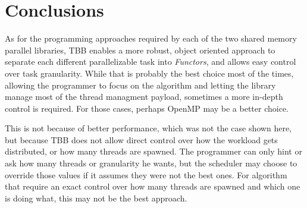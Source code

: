 \section{Conclusions}
\label{sec:900}

As for the programming approaches required by each of the two shared memory parallel libraries, TBB enables a more robust, object oriented approach to separate each different parallelizable task into \textit{Functors}, and allows easy control over task granularity. While that is probably the best choice most of the times, allowing the programmer to focus on the algorithm and letting the library manage most of the thread managment payload, sometimes a more in-depth control is required. For those cases, perhaps OpenMP may be a better choice.

This is not because of better performance, which was not the case shown here, but because TBB does not allow direct control over how the workload gets distributed, or how many threads are spawned. The programmer can only hint or ask how many threads or granularity he wants, but the scheduler may choose to override those values if it assumes they were not the best ones. For algorithm that require an exact control over how many threads are spawned and which one is doing what, this may not be the best approach.
